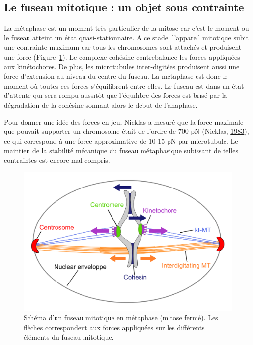 \documentclass[12pt,a4paper,twoside,openright]{book}
\begin{document}
\subsection{Le fuseau mitotique : un objet sous
contrainte}\label{le-fuseau-mitotique-un-objet-sous-contrainte}

La métaphase est un moment très particulier de la mitose car c'est le
moment ou le fuseau atteint un état quasi-stationnaire. A ce stade,
l'appareil mitotique subit une contrainte maximum car tous les
chromosomes sont attachés et produisent une force
(Figure~\ref{fig:spindle}). Le complexe cohésine contrebalance les
forces appliquées aux kinétochores. De plus, les microtubules
inter-digitées produisent aussi une force d'extension au niveau du
centre du fuseau. La métaphase est donc le moment où toutes ces forces
s'équilibrent entre elles. Le fuseau est dans un état d'attente qui sera
rompu aussitôt que l'équilibre des forces est brisé par la dégradation
de la cohésine sonnant alors le début de l'anaphase.

Pour donner une idée des forces en jeu, Nicklas a mesuré que la force
maximale que pouvait supporter un chromosome était de l'ordre de 700 pN
(Nicklas, \hyperref[ref-Nicklas1983]{1983}), ce qui correspond à une
force approximative de 10-15 pN par microtubule. Le maintien de la
stabilité mécanique du fuseau métaphasique subissant de telles
contraintes est encore mal compris.

\begin{figure}[htbp]
\centering
\includegraphics{figures/intro/spindle.png}
\caption[Schéma d'un fuseau mitotique en métaphase]{\label{fig:spindle}Schéma
d'un fuseau mitotique en métaphase (mitose fermé). Les flèches
correspondent aux forces appliquées sur les différents éléments du
fuseau mitotique.}
\end{figure}
\end{document}

